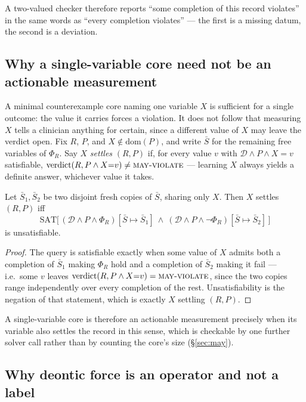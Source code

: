 A two-valued checker therefore reports ``some completion of this record
violates'' in the same words as ``every completion violates'' --- the first is a
missing datum, the second is a deviation.

\subsection{Why a single-variable core need not be an actionable measurement}

A minimal counterexample core naming one variable $X$ is sufficient for a
single outcome: the value it carries forces a violation. It does not follow
that measuring $X$ tells a clinician anything for certain, since a different
value of $X$ may leave the verdict open. Fix $R$, $P$, and $X \notin
\mathrm{dom}(P)$, and write $\bar S$ for the remaining free variables of
$\Phi_R$. Say $X$ \emph{settles} $(R,P)$ if, for every value $v$ with
$\mathcal{D}\wedge P \wedge X{=}v$ satisfiable, $\mathrm{verdict}(R, P \wedge
X{=}v) \neq \textsc{may-violate}$ --- learning $X$ always yields a definite
answer, whichever value it takes.

\begin{proposition}
\label{prop:settle}
Let $\bar S_1, \bar S_2$ be two disjoint fresh copies of $\bar S$, sharing
only $X$. Then $X$ settles $(R,P)$ iff
\[
  \mathrm{SAT}\bigl[\, (\mathcal{D} \wedge P \wedge \Phi_R)[\bar S {\mapsto} \bar S_1]
    \ \wedge\ (\mathcal{D} \wedge P \wedge \neg\Phi_R)[\bar S {\mapsto} \bar S_2] \,\bigr]
\]
is unsatisfiable.
\end{proposition}
\begin{proof}
The query is satisfiable exactly when some value of $X$ admits both a
completion of $\bar S_1$ making $\Phi_R$ hold and a completion of $\bar S_2$
making it fail --- i.e.\ some $v$ leaves $\mathrm{verdict}(R,P\wedge X{=}v) =
\textsc{may-violate}$, since the two copies range independently over every
completion of the rest. Unsatisfiability is the negation of that statement,
which is exactly $X$ settling $(R,P)$.
\end{proof}

A single-variable core is therefore an actionable measurement precisely when
its variable also settles the record in this sense, which is checkable by one
further solver call rather than by counting the core's size (\S\ref{sec:may}).

\subsection{Why deontic force is an operator and not a label}

